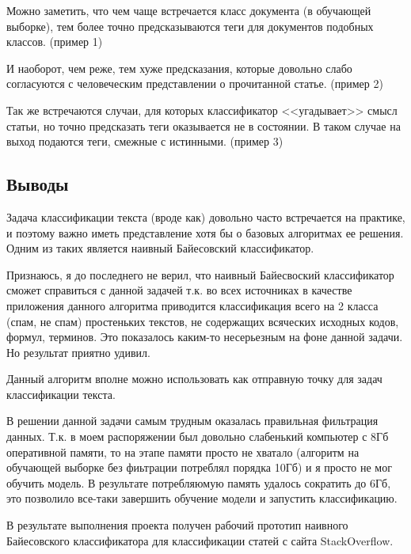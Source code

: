 \documentclass[12pt,a4paper]{scrartcl}
\begin{document}
Можно заметить, что чем чаще встречается класс документа (в обучающей выборке), тем более точно предсказываются теги для документов подобных классов. (пример 1)

И наоборот, чем реже, тем хуже предсказания, которые довольно слабо согласуются с человеческим представлении о прочитанной статье. (пример 2)

Так же встречаются случаи, для которых классификатор <<угадывает>> смысл статьи, но точно предсказать теги оказывается не в состоянии. В таком случае на выход подаются теги, смежные с истинными. (пример 3)

\subsection*{Выводы}

Задача классификации текста (вроде как) довольно часто встречается на практике, и поэтому важно иметь представление хотя бы о базовых алгоритмах ее решения. Одним из таких является наивный Байесовский классификатор. 

Признаюсь, я до последнего не верил, что наивный Байесвоский классификатор сможет справиться с данной задачей т.к. во всех источниках в качестве приложения данного алгоритма приводится классификация всего на 2 класса (спам, не спам) простеньких текстов, не содержащих всяческих исходных кодов, формул, терминов. Это показалось каким-то несерьезным на фоне данной задачи. 
Но результат приятно удивил.

Данный алгоритм вполне можно использовать как отправную точку для задач классификации текста.

В решении данной задачи самым трудным оказалась правильная фильтрация данных. Т.к. в моем распоряжении был довольно слабенький компьютер с 8Гб оперативной памяти, то на этапе памяти просто не хватало (алгоритм на обучающей выборке без фиьтрации потреблял порядка 10Гб) и я просто не мог обучить модель. В результате потребляюмую память удалось сократить до 6Гб, это позволило все-таки завершить обучение модели и запустить классификацию.

В результате выполнения проекта получен рабочий прототип наивного Байесовского классификатора для классификации статей с сайта StackOverflow.
\end{document}
